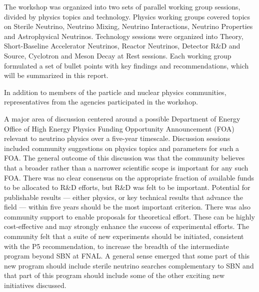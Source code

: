 The workshop was organized into two sets of parallel working group
sessions, divided by physics topics and technology.  Physics working
groups covered topics on Sterile Neutrino, Neutrino Mixing, Neutrino
Interactions, Neutrino Properties and Astrophysical Neutrinos.
Technology sessions were organized into Theory, Short-Baseline
Accelerator Neutrinos, Reactor Neutrinos, Detector R\&D and Source,
Cyclotron and Meson Decay at Rest sessions.  Each working group
formulated a set of bullet points with key findings and
recommendations, which will be summarized in this report.


In addition to members of the particle and nuclear physics
communities, representatives from the agencies participated in the workshop.

A major area of discussion centered around a possible Department of Energy
Office of High Energy Physics Funding Opportunity
Announcement (FOA) relevant to neutrino physics over a five-year timescale.
Discussion sessions included community suggestions on physics topics and parameters for such a FOA.
The general outcome of this discussion was that the community believes that a
broader rather than a narrower scientific scope is important for any such FOA.  There was no clear
consensus on the appropriate fraction of available funds to be
allocated to R\&D efforts, but R\&D was felt to be important.  
Potential for publishable results ---
either physics, or key technical results that advance the field ---
within five years should be the most important criterion.  There was
also community support to enable proposals for theoretical effort.
These can be highly cost-effective and may strongly enhance the
success of experimental efforts.  
The community felt that a suite of new experiments should be
initiated, consistent with the P5 recommendation, to increase the
breadth of the intermediate program beyond SBN at FNAL. A general
sense emerged that some part of this new program should include
sterile neutrino searches complementary to SBN and that part of this
program should include some of the other exciting new initiatives
discussed.

